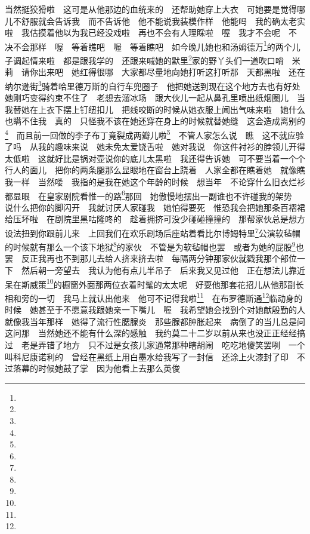 \par 当然挺狡猾啦　这可是从他那边的血统来的　还帮助她穿上大衣　可她要是觉得哪儿不舒服就会告诉我　而不告诉他　他不能说我装模作样　他能吗　我的确太老实啦　我估摸着他以为我已经没戏啦　再也不会有人理睬啦　喔　我才不会呢　不　决不会那样　喔　等着瞧吧　喔　等着瞧吧　如今晚儿她也和汤姆德万\footnote{}的两个儿子调起情来啦　都是跟我学的　还跟来喊她的默里\footnote{}家的野丫头们一道吹口哨　米莉　请你出来吧　她红得很哪　大家都尽量地向她打听这打听那　天都黑啦　还在纳尔逊街\footnote{}骑着哈里德万斯的自行车兜圈子　他把她送到现在这个地方去也有好处　她刚巧变得约束不住了　老想去溜冰场　跟大伙儿一起从鼻孔里喷出纸烟圈儿　当我替她在上衣下摆上钉纽扣儿　把线咬断的时候从她衣服上闻出气味来啦　她什么也瞒不住我　真的　只怪我不该在她还穿在身上的时候就替她缝　这会造成离别的\footnote{}　而且前一回做的李子布丁竟裂成两瓣儿啦\footnote{}　不管人家怎么说　瞧　这不就应验了吗　从我的趣味来说　她未免太爱饶舌啦　她对我说　你这件衬衫的脖领儿开得太低啦　这就好比是锅对壶说你的底儿太黑啦　我还得告诉她　可不要当着一个个行人的面儿　把你的两条腿那么显眼地在窗台上跷着　人家全都在瞧着她　就像瞧我一样　当然喽　我指的是我在她这个年龄的时候　想当年　不论穿什么旧衣烂衫都显眼　在皇家剧院看惟一的路\footnote{}那回　她傲慢地摆出一副谁也不许碰我的架势　说什么把你的脚闪开　我就讨厌人家碰我　她怕得要死　惟恐我会把她那条百褶裙给压坏啦　在剧院里黑咕隆咚的　趁着拥挤可没少碰碰撞撞的　那帮家伙总是想方设法扭到你跟前儿来　上回我们在欢乐剧场后座站着看比尔博姆特里\footnote{}公演软毡帽的时候就有那么一个该下地狱\footnote{}的家伙　不管是为软毡帽也罢　或者为她的屁股\footnote{}也罢　反正我再也不到那儿去给人挤来挤去啦　每隔两分钟那家伙就戳我那个部位一下　然后朝一旁望去　我认为他有点儿半吊子　后来我又见过他　正在想法儿靠近呆在斯威策\footnote{}的橱窗外面那两位衣着时髦的太太呢　好耍他那套花招儿从他那副长相和旁的一切　我马上就认出他来　他可不记得我啦\footnote{}　在布罗德斯通\footnote{}临动身的时候　她甚至于不愿意我跟她亲一下嘴儿　喔　我希望她会找到个对她献殷勤的人　就像我当年那样　她得了流行性腮腺炎　那些腺都肿胀起来　病倒了的当儿总是问这问那　当然她还不能有什么深的感触　我约莫二十二岁以前从来也没正正经经搞过　老是弄错了地方　只不过是女孩儿家通常那种瞎胡闹　吃吃地傻笑罢咧　一个叫科尼康诺利的　曾经在黑纸上用白墨水给我写了一封信　还涂上火漆封了印　不过落幕的时候她鼓了掌　因为他看上去那么英俊　
